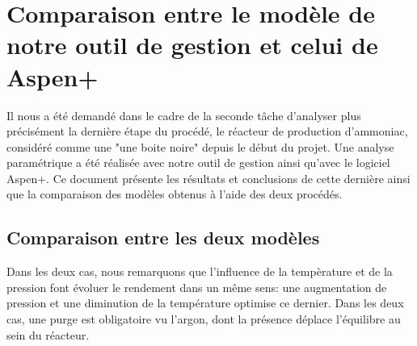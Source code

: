 
\section*{Comparaison entre le modèle de notre outil de gestion et celui de Aspen+}
Il nous a été demandé dans le cadre de la seconde tâche d'analyser plus précisément la dernière étape du procédé, le réacteur de production d'ammoniac, considéré comme une "une boite noire" depuis le début du projet. Une analyse paramétrique a été réalisée avec notre outil de gestion ainsi qu'avec le logiciel Aspen+. Ce document présente les résultats et conclusions de cette dernière ainsi que la comparaison des modèles obtenus à l'aide des deux procédés.


\subsection*{Comparaison entre les deux modèles}
Dans les deux cas, nous remarquons que l'influence de la tempèrature et de la pression font évoluer le rendement dans un même sens: une augmentation de pression et une diminution de la température optimise ce dernier.
Dans les deux cas, une purge est obligatoire vu l'argon, dont la présence déplace l'équilibre au sein du réacteur.


